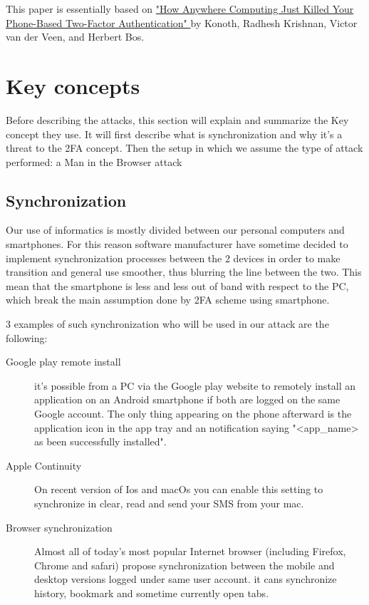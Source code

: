 \documentclass[11pt, a4paper,twocolumn]{article}
\begin{document}
This paper is essentially based on \href{http://fc16.ifca.ai/preproceedings/24_Konoth.pdf}{"How Anywhere Computing Just Killed Your Phone-Based Two-Factor Authentication" } by  Konoth, Radhesh Krishnan, Victor van der Veen, and Herbert Bos. \cite{Base}

\section{Key concepts}
Before describing the attacks, this section will explain and summarize the Key concept they use. It will first describe what is synchronization and why it's a threat to the 2FA concept. Then the setup in which we assume the type of attack performed: a Man in the Browser attack
\subsection{Synchronization}
Our use of informatics is mostly divided between our personal computers 
and smartphones. For this reason software manufacturer have sometime decided to implement synchronization processes between the 2 devices in order to make transition and general use smoother, thus blurring the line between the two. This mean that the smartphone is less and less out of band with respect to the PC, which break the main assumption done by 2FA scheme using smartphone.

3 examples of such synchronization who will be used in our attack are the 
following:
\begin{description}
  \item[Google play remote install] it's possible from a PC via the Google play website to remotely install an application on an Android smartphone if both are logged on the same Google account. The only thing appearing on the phone afterward is the application icon in the app tray and an notification saying "<app\_name> as been successfully installed".
  
  \item[Apple Continuity] On recent version of Ios and macOs you can enable this setting to synchronize in clear, read and send your SMS from your mac.
  
  \item[Browser synchronization] Almost all of today's most popular Internet browser (including Firefox, Chrome and safari) propose synchronization between the mobile and desktop versions logged under same user account. it cans synchronize history, bookmark and sometime currently open tabs.
\end{description}
\end{document}
